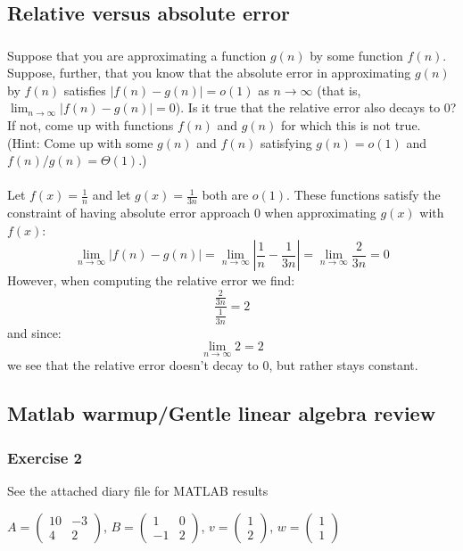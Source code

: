 \documentclass{article}
\begin{document}
\subsection{Relative versus absolute error}

\subsubsection{}
Suppose that you are approximating a function $g(n)$ by some function $f(n)$. Suppose, further, that you know that the absolute error in approximating $g(n)$ by $f(n)$ satisfies $|f(n)-g(n)| = o(1)$ as $n\to \infty$ (that is, $\lim_{n\to\infty} |f(n) - g(n)| = 0$). Is it true that the relative error also decays to 0? If not, come up with functions $f(n)$ and $g(n)$ for which this is not true. (Hint: Come up with some $g(n)$ and $f(n)$ satisfying $g(n) = o(1)$ and $f(n)/g(n) = \Theta(1)$.)
\\\\
Let $f(x) = \frac{1}{n}$ and let $g(x) = \frac{1}{3n}$ both are $o(1)$. These functions satisfy the constraint of having absolute error approach 0 when approximating $g(x)$ with $f(x)$:
\[\lim_{n\to\infty} |f(n) - g(n)| = \lim_{n\to\infty}\left|\frac{1}{n} - \frac{1}{3n}\right| = \lim_{n\to\infty}\frac{2}{3n} = 0\]
However, when computing the relative error we find:
\[\frac{\frac{2}{3n}}{\frac{1}{3n}} = 2\]
and since:
\[\lim_{n\to\infty}2 = 2\]
we see that the relative error doesn't decay to 0, but rather stays constant. 

\subsection{Matlab warmup/Gentle linear algebra review}

\subsubsection{Exercise 2}
See the attached diary file for MATLAB results

$A = \begin{pmatrix}10 & -3\\4&2\end{pmatrix}$, $B = \begin{pmatrix}1 & 0\\-1&2\end{pmatrix}$, $v = \begin{pmatrix}1\\2\end{pmatrix}$, $w = \begin{pmatrix}1\\1\end{pmatrix}$
\end{document}
